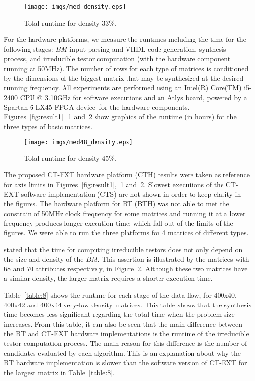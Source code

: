 \documentclass[letterpaper, twoside, openright, 12pt]{book}%
\begin{document}
	\begin{figure}[htb]
	  \centering
	   \texttt{[image: imgs/med\_density.eps]}
	  \caption{Total runtime for density 33\%.}
	  \label{fig:result2}
	\end{figure}
	
	For the hardware platforms, we measure the runtimes including the time for the following stages: $BM$ input parsing and VHDL code generation, synthesis process, and irreducible testor computation (with the hardware component running at 50MHz). The number of rows for each type of matrices is conditioned by the dimensions of the biggest matrix that may be synthesized at the desired running frequency. All experiments are performed using an Intel(R) Core(TM) i5-2400 CPU @ 3.10GHz for software executions and 
	an Atlys board, powered by a Spartan-6 LX45 FPGA device, for the hardware components. Figures~\ref{fig:result1},~\ref{fig:result2} and~\ref{fig:result3} show graphics of the runtime (in hours) for the three types of basic matrices. 
	
	\begin{figure}[htb]
	    \begin{center}
	       \texttt{[image: imgs/med48\_density.eps]}
	    \end{center}
	\caption{Total runtime for density 45\%.}
	\label{fig:result3}
	\end{figure}
	
	The proposed CT-EXT hardware platform (CTH) results were taken as reference for axis limits in Figures~\ref{fig:result1},~\ref{fig:result2} and~\ref{fig:result3}. Slowest executions of the CT-EXT software implementation (CTS) are not shown in order to keep clarity in the figures. The hardware platform for BT (BTH) was not able to met the constrain of 50MHz clock frequency for some matrices and running it at a lower frequency produces longer execution time; which fall out of the limits of the figures. We were able to run the three platforms for 4 matrices of different types. 
	
	\cite{Rojas12} stated that the time for computing irreducible testors does not only depend on the size and density of the $BM$. This assertion is illustrated by the matrices with 68 and 70 attributes respectively, in Figure~\ref{fig:result3}. Although these two matrices have a similar density, the larger matrix requires	a shorter execution time.
	
	Table~\ref{table:8} shows the runtime for each stage of the data flow, for 400x40, 400x42 and 400x44 very-low density matrices. This table shows that the synthesis time becomes less significant regarding the total time when the problem size increases. From this table, it can also be seen that the main difference between the BT and CT-EXT hardware implementations is the runtime of the irreducible testor computation process. The main reason for this difference is the number of candidates evaluated by each algorithm. This is an explanation about why the BT hardware implementation is slower than the software version of CT-EXT for the largest matrix in Table~\ref{table:8}.
	
\end{document}
